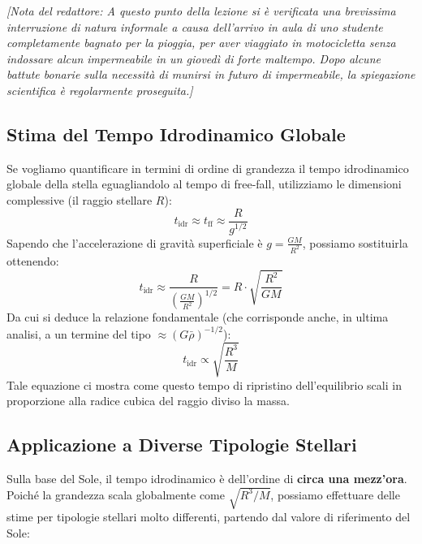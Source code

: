 \textit{[Nota del redattore: A questo punto della lezione si è verificata una brevissima interruzione di natura informale a causa dell'arrivo in aula di uno studente completamente bagnato per la pioggia, per aver viaggiato in motocicletta senza indossare alcun impermeabile in un giovedì di forte maltempo. Dopo alcune battute bonarie sulla necessità di munirsi in futuro di impermeabile, la spiegazione scientifica è regolarmente proseguita.]}

\subsection{Stima del Tempo Idrodinamico Globale}
Se vogliamo quantificare in termini di ordine di grandezza il tempo idrodinamico globale della stella eguagliandolo al tempo di free-fall, utilizziamo le dimensioni complessive (il raggio stellare $R$):
\begin{equation}
t_{\text{idr}} \approx t_{\text{ff}} \approx \frac{R}{g^{1/2}}
\end{equation}
Sapendo che l'accelerazione di gravità superficiale è $g = \frac{GM}{R^2}$, possiamo sostituirla ottenendo:
\begin{equation}
t_{\text{idr}} \approx \frac{R}{\left( \frac{GM}{R^2} \right)^{1/2}} = R \cdot \sqrt{\frac{R^2}{GM}}
\end{equation}
Da cui si deduce la relazione fondamentale (che corrisponde anche, in ultima analisi, a un termine del tipo $\approx (G\bar{\rho})^{-1/2}$):
\begin{equation}
t_{\text{idr}} \propto \sqrt{\frac{R^3}{M}}
\end{equation}
Tale equazione ci mostra come questo tempo di ripristino dell'equilibrio scali in proporzione alla radice cubica del raggio diviso la massa.

\subsection{Applicazione a Diverse Tipologie Stellari}
Sulla base del Sole, il tempo idrodinamico è dell'ordine di \textbf{circa una mezz'ora}. Poiché la grandezza scala globalmente come $\sqrt{R^3/M}$, possiamo effettuare delle stime per tipologie stellari molto differenti, partendo dal valore di riferimento del Sole:

